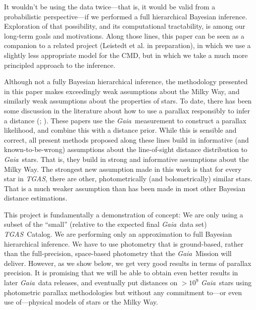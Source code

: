 \documentclass[modern]{aastex61}
\newcommand{\acronym}[1]{{\small{#1}}}
\newcommand{\project}[1]{\textsl{#1}}
\newcommand{\tgas}{\project{\acronym{TGAS}}}
\newcommand{\gaia}{\project{Gaia}}
\newcommand{\cmd}{\acronym{CMD}}
\begin{document}
It wouldn't be using the data twice---that is, it would be valid from a
probabilistic perspective---if we performed a full hierarchical Bayesian
inference.
Exploration of that possibility, and its computational tractability,
is among our long-term goals and motivations.
Along those lines, this paper can be seen as a companion to a related
project (Leistedt et al. in preparation), in which we use a slightly less appropriate
model for the \cmd, but in which we take a much more principled
approach to the inference.

Although not a fully Bayesian hierarchical inference, the methodology presented in this paper makes exceedingly weak assumptions
about the Milky Way, and similarly weak assumptions about the properties of
stars.
To date, there has been some discussion in the literature
about how to use a parallax responsibly to infer a distance (\citealt{astraatmadja16a}; \citealt{astraatmadja16b}).
These papers use the \gaia\ measurement to construct a parallax likelihood,
and combine this with a distance prior.
While this is sensible and correct, all present methods proposed along
these lines build in informative (and known-to-be-wrong) assumptions
about the line-of-sight distance distribution to \gaia\ stars.
That is, they build in strong and informative assumptions about the Milky
Way.
The strongest new assumption made in this work is that for every star
in \tgas, there are other, photometrically (and bolometrically)
similar stars.
That is a much weaker assumption than has been made in most other Bayesian
distance estimations.

This project is fundamentally a demonstration of concept:
We are only using a subset of the ``small'' (relative to the expected final \gaia\ data set)
\tgas\ Catalog.
We are performing only an approximation to full Bayesian hierarchical inference.
We have to use photometry that is ground-based, rather than the full-precision,
space-based photometry that the \gaia\ Mission will deliver.
However, as we show below, we get very good results in terms of parallax precision.
It is promising that we will be able to obtain even better results
in later \gaia\ data releases, and eventually put distances on $>10^9$
\gaia\ stars using photometric parallax methodologies but without any
commitment to---or even use of---physical models of stars or the Milky Way.
\end{document}
